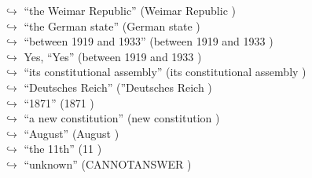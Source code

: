 \documentclass[11pt,a4paper, onecolumn]{article}
\begin{document}
\begin{figure}[t] \small \begin{tcolorbox}[boxsep=0pt,left=5pt,right=0pt,top=2pt,colback = yellow!5] \begin{dialogue}
 \small 
\colorbox{pink!25}{$\hookrightarrow$}
{ ``the Weimar Republic'' (Weimar Republic ) }
\\
\colorbox{pink!25}{$\hookrightarrow$}
{ ``the German state'' (German state ) }
\\
\colorbox{pink!25}{$\hookrightarrow$}
{ ``between 1919 and 1933'' (between 1919 and 1933 ) }
\\
\colorbox{pink!25}{$\hookrightarrow$}
\colorbox{red!25}{Yes,}
{ ``Yes'' (between 1919 and 1933 ) }
\\
\colorbox{pink!25}{$\hookrightarrow$}
{ ``its constitutional assembly'' (its constitutional assembly ) }
\\
\colorbox{pink!25}{$\hookrightarrow$}
{ ``Deutsches Reich'' (''Deutsches Reich ) }
\\
\colorbox{pink!25}{$\hookrightarrow$}
{ ``1871'' (1871 ) }
\\
\colorbox{pink!25}{$\hookrightarrow$}
{ ``a new constitution'' (new constitution ) }
\\
\colorbox{pink!25}{$\hookrightarrow$}
{ ``August'' (August ) }
\\
\colorbox{pink!25}{$\hookrightarrow$}
{ ``the 11th'' (11 ) }
\\
\colorbox{pink!25}{$\hookrightarrow$}
{ ``unknown'' (CANNOTANSWER ) }
\\
 \end{dialogue}\end{tcolorbox}\end{figure}
\end{document}
